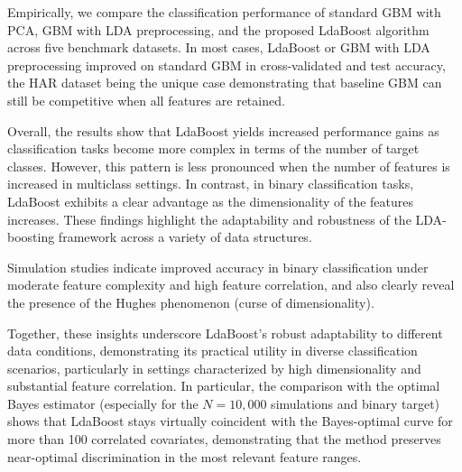 \documentclass[11pt,a4paper]{article}
\begin{document}
Empirically, we compare the classification performance of standard GBM with PCA, GBM with LDA preprocessing, and the proposed LdaBoost algorithm across five benchmark datasets. In most cases, LdaBoost or GBM with LDA preprocessing improved on standard GBM in cross-validated and test accuracy, the HAR dataset being the unique case demonstrating that baseline GBM can still be competitive when all features are retained.

Overall, the results show that LdaBoost yields increased performance gains as classification tasks become more complex in terms of the number of target classes. However, this pattern is less pronounced when the number of features is increased in multiclass settings. In contrast, in binary classification tasks, LdaBoost exhibits a clear advantage as the dimensionality of the features increases. These findings highlight the adaptability and robustness of the LDA-boosting framework across a variety of data structures.

Simulation studies indicate improved accuracy in binary classification under moderate feature complexity and high feature correlation, and also clearly reveal the presence of the Hughes phenomenon (curse of dimensionality).

Together, these insights underscore LdaBoost’s robust adaptability to different data conditions, demonstrating its practical utility in diverse classification scenarios, particularly in settings characterized by high dimensionality and substantial feature correlation. In particular, the comparison with the optimal Bayes estimator (especially for the $N=10{,}000$ simulations and binary target) shows that LdaBoost stays virtually coincident with the Bayes-optimal curve for more than 100 correlated covariates, demonstrating that the method preserves near-optimal discrimination in the most relevant feature ranges.
\end{document}
